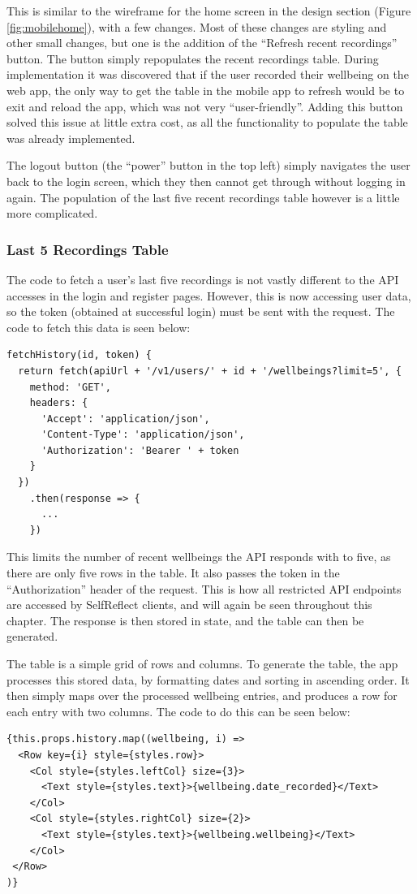 \documentclass[11pt,openright,a4paper]{report}
\begin{document}
This is similar to the wireframe for the home screen in the design section (Figure \ref{fig:mobilehome}), with a few changes. Most of these changes are styling and other small changes, but one is the addition of the \enquote{Refresh recent recordings} button. The button simply repopulates the recent recordings table. During implementation it was discovered that if the user recorded their wellbeing on the web app, the only way to get the table in the mobile app to refresh would be to exit and reload the app, which was not very \enquote{user-friendly}. Adding this button solved this issue at little extra cost, as all the functionality to populate the table was already implemented.

The logout button (the \enquote{power} button in the top left) simply navigates the user back to the login screen, which they then cannot get through without logging in again. The population of the last five recent recordings table however is a little more complicated.

\subsubsection{Last 5 Recordings Table}
The code to fetch a user's last five recordings is not vastly different to the API accesses in the login and register pages. However, this is now accessing user data, so the token (obtained at successful login) must be sent with the request. The code to fetch this data is seen below:

\begin{lstlisting}
fetchHistory(id, token) {
  return fetch(apiUrl + '/v1/users/' + id + '/wellbeings?limit=5', {
    method: 'GET',
    headers: {
      'Accept': 'application/json',
      'Content-Type': 'application/json',
      'Authorization': 'Bearer ' + token
    }
  })
    .then(response => {
      ...
    })
\end{lstlisting}

This limits the number of recent wellbeings the API responds with to five, as there are only five rows in the table. It also passes the token in the \enquote{Authorization} header of the request. This is how all restricted API endpoints are accessed by SelfReflect clients, and will again be seen throughout this chapter. The response is then stored in state, and the table can then be generated.

The table is a simple grid of rows and columns. To generate the table, the app processes this stored data, by formatting dates and sorting in ascending order. It then simply maps over the processed wellbeing entries, and produces a row for each entry with two columns. The code to do this can be seen below:
\begin{lstlisting}
{this.props.history.map((wellbeing, i) =>
  <Row key={i} style={styles.row}>
    <Col style={styles.leftCol} size={3}>
      <Text style={styles.text}>{wellbeing.date_recorded}</Text>
    </Col>
    <Col style={styles.rightCol} size={2}>
      <Text style={styles.text}>{wellbeing.wellbeing}</Text>
    </Col>
 </Row>
)}
\end{lstlisting}
\end{document}
